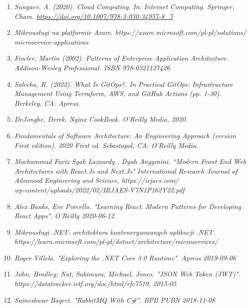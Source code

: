 \begin{enumerate}
\item {\textit{Sunyaev, A. (2020). Cloud Computing. In: Internet Computing. Springer, Cham. \url{https://doi.org/10.1007/978-3-030-34957-8_7}}}
\item {\textit {Mikrousługi na platformie Azure.  https://azure.microsoft.com/pl-pl/solutions/\\microservice-applications}}
\item {\textit {Fowler, Martin (2002). Patterns of Enterprise Application Architecture. Addison-Wesley Professional. ISBN 978-0321127426}}
\item {\textit {Salecha, R. (2022). What Is GitOps?. In Practical GitOps: Infrastructure Management Using Terraform, AWS, and GitHub Actions (pp. 1-30). Berkeley, CA: Apress.}}
\item {\textit {DeJonghe, Derek. Nginx CookBook. O'Reilly Media, 2020.}}
\item {\textit {Fundamentals of Software Architecture: An Engineering Approach (version First edition). 2020 First ed. Sebastopol, CA: O’Reilly Media. }}
\item {\textit {Mochammad Fariz Syah Lazuardy
, Dyah Anggraini. “Modern Front End Web Architectures with React.Js
and Next.Js" International Research Journal of Advanced Engineering and Science, https://irjaes.com/\\wp-content/uploads/2022/02/IRJAES-V7N1P162Y22.pdf}}
\item {\textit {Alex Banks, Eve Porcello. "Learning React: Modern Patterns for Developing React Apps". O'Reilly 2020-06-12}}
\item {\textit {Mikrousługi .NET: architektura konteneryzowanych aplikacji .NET. \\ https://learn.microsoft.com/pl-pl/dotnet/architecture/microservices/}}
\item {\textit{Roger Villela. "Exploring the .NET Core 3.0 Runtime". Apress 2019-09-06}}
\item {\textit {John, Bradley; Nat, Sakimura; Michael, Jones. "JSON Web Token (JWT)". https://datatracker.ietf.org/doc/html/rfc7519, 2015-05}}
\item {\textit {Saineshwar Bageri. "RabbitMQ With C\#". BPB PUBN 2018-11-08}}

\end{enumerate}